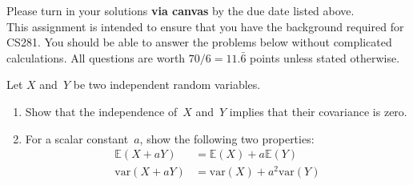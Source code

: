 \documentclass{harvardml}
\newcommand{\E}{\mathbb{E}}
\newcommand{\var}{\text{var}}
\begin{document}
\noindent Please turn in your solutions \textbf{via canvas} by the due date listed above.
\\

\noindent This assignment is intended to ensure that you have the background required for CS281. You should be able to answer the problems below without complicated calculations. All questions are worth $70/6 = 11.\bar{6}$ points unless stated otherwise.

\begin{problem}
Let $X$ and~$Y$ be two independent random variables.

\begin{enumerate}[label=(\alph*)]
\item Show that the independence of~$X$ and~$Y$ implies that their
covariance is zero.

\item For a scalar constant~$a$, show the following two properties:
\begin{align*}
  \E(X + aY) &= \E(X) + a\E(Y)\\
  \var(X + aY) &= \var(X) + a^2\var(Y)
\end{align*}
\end{enumerate}
\end{problem}
\end{document}
